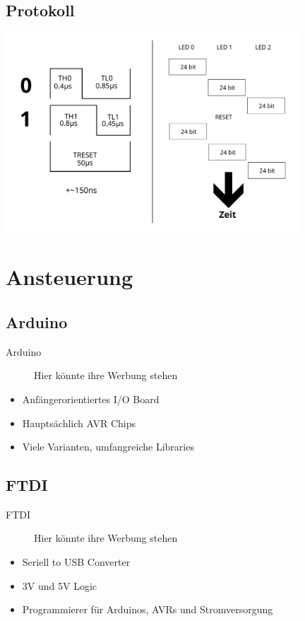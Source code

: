 \documentclass{beamer}
\begin{document}
\subsection{Protokoll}
\begin{frame}
\begin{center}
 \includegraphics[width=11cm]{protokoll}
\end{center}
\end{frame}

\section{Ansteuerung}
\subsection{Arduino}
\begin{frame}{Arduino}
\begin{figure}[h]
 \centering
 Hier könnte ihre Werbung stehen
\end{figure}
\begin{itemize}
 \item Anfängerorientiertes I/O Board
 \item Hauptsächlich AVR Chips
 \item Viele Varianten, umfangreiche Libraries

\end{itemize}
\end{frame}

\subsection{FTDI}
\begin{frame}{FTDI}
\begin{figure}[h]
 \centering
 Hier könnte ihre Werbung stehen
\end{figure}
\begin{itemize}
 \item Seriell to USB Converter
 \item 3V und 5V Logic
 \item Programmierer für Arduinos, AVRs und Stromversorgung
\end{itemize}

\end{frame}
\end{document}
